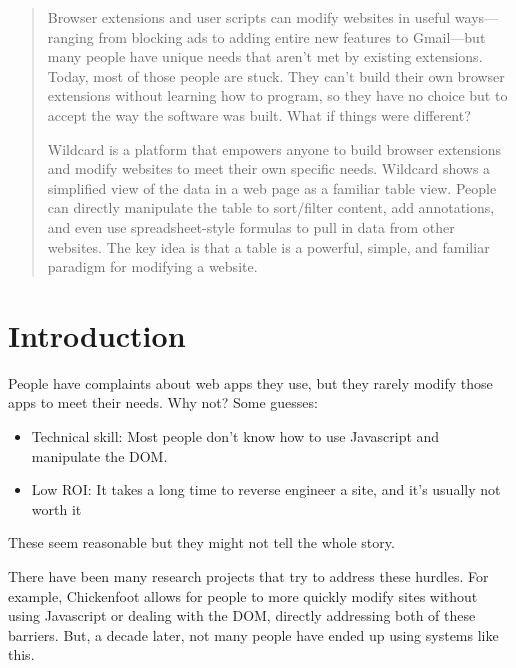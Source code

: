 \documentclass[english,submission]{programming}
\begin{document}
\begin{abstract}
Browser extensions and user scripts can modify websites in useful
ways---ranging from blocking ads to adding entire new features to
Gmail---but many people have unique needs that aren't met by existing
extensions. Today, most of those people are stuck. They can't build
their own browser extensions without learning how to program, so they
have no choice but to accept the way the software was built. What if
things were different?

Wildcard is a platform that empowers anyone to build browser extensions
and modify websites to meet their own specific needs. Wildcard shows a
simplified view of the data in a web page as a familiar table view.
People can directly manipulate the table to sort/filter content, add
annotations, and even use spreadsheet-style formulas to pull in data
from other websites. The key idea is that a table is a powerful, simple,
and familiar paradigm for modifying a website.
\end{abstract}


\hypertarget{introduction}{%
\section{Introduction}\label{introduction}}

People have complaints about web apps they use, but they rarely modify
those apps to meet their needs. Why not? Some guesses:

\begin{itemize}
\tightlist
\item
  Technical skill: Most people don't know how to use Javascript and
  manipulate the DOM.
\item
  Low ROI: It takes a long time to reverse engineer a site, and it's
  usually not worth it
\end{itemize}

These seem reasonable but they might not tell the whole story.

There have been many research projects that try to address these
hurdles. For example, Chickenfoot allows for people to more quickly
modify sites without using Javascript or dealing with the DOM, directly
addressing both of these barriers. But, a decade later, not many people
have ended up using systems like this.
\end{document}
